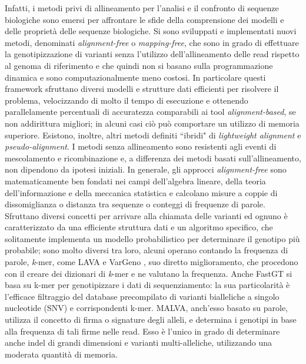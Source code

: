\documentclass[../main.tex]{subfiles}
\begin{document}
\noindent
Infatti, i metodi privi di allineamento per l'analisi e il confronto di sequenze biologiche sono emersi per affrontare le sfide della comprensione dei modelli e delle proprietà delle sequenze biologiche. Si sono sviluppati e implementati nuovi metodi, denominati \textit{alignment-free} o \textit{mapping-free}, che sono in grado di effettuare la genotipizzazione di varianti senza l'utilizzo dell'allineamento delle read rispetto al genoma di riferimento e che quindi non si basano sulla programmazione dinamica e sono computazionalmente meno costosi. In particolare questi framework sfruttano diversi modelli e strutture dati efficienti per risolvere il problema, velocizzando di molto il tempo di esecuzione e ottenendo parallelamente percentuali di accuratezza comparabili ai tool \textit{alignment-based}, se non addirittura migliori; in alcuni casi ciò può comportare un utilizzo di memoria superiore. Esistono, inoltre, altri metodi definiti ``ibridi" di \textit{lightweight alignment} e \textit{pseudo-alignment}. 
I metodi senza allineamento sono resistenti agli eventi di mescolamento e ricombinazione e, a differenza dei metodi basati sull'allineamento, non dipendono da ipotesi iniziali. In generale, gli approcci \textit{alignment-free} sono matematicamente ben fondati nei campi dell'algebra lineare, della teoria dell'informazione e della meccanica statistica e calcolano misure a coppie di dissomiglianza o distanza tra sequenze o conteggi di frequenze di parole. Sfruttano diversi concetti per arrivare alla chiamata delle varianti ed ognuno è caratterizzato da una efficiente struttura dati e un algoritmo specifico, che solitamente implementa un modello probabilistico per determinare il genotipo più probabile; sono molto diversi tra loro, alcuni operano contando la frequenza di parole, \textit{k}-mer, come LAVA \cite{shajii2016lava} e VarGeno \cite{sun-medvedev2018vargeno}, suo diretto miglioramento, che procedono con il creare dei dizionari di \textit{k}-mer e ne valutano la frequenza.
Anche FastGT \cite{pajuste2017fastgt} si basa su k-mer per genotipizzare i dati di sequenziamento: la sua particolarità è l'efficace filtraggio del database precompilato di varianti bialleliche a singolo nucleotide (SNV) e corrispondenti k-mer. MALVA, anch'esso basato su parole, utilizza il concetto di firma o signature degli alleli, e determina i genotipi in base alla frequenza di tali firme nelle read. Esso è l'unico in grado di determinare anche indel di grandi dimensioni e varianti multi-alleliche, utilizzando una moderata quantità di memoria.
\end{document}
